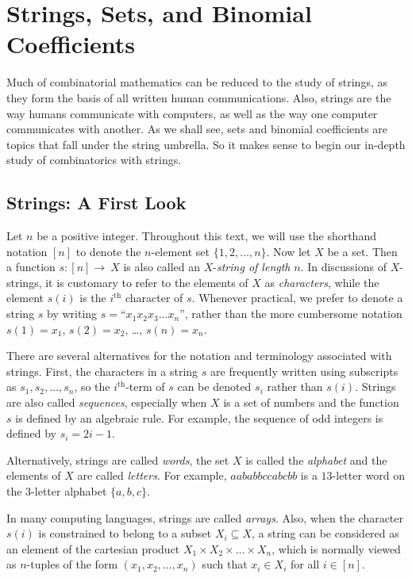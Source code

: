 
\chapter{Strings, Sets, and Binomial Coefficients}\label{ch:strings}

Much of combinatorial mathematics can be reduced to the study of
strings, as they form the basis of all written human communications.
Also, strings are the way humans communicate with computers, as well
as the way one computer communicates with another. As we shall see,
sets and binomial coefficients are topics that fall under the string
umbrella. So it makes sense to begin our in-depth study of
combinatorics with strings.

\section{Strings: A First Look}\label{s:strings:intro}

Let $n$ be a positive integer.  Throughout this text, we will use the
shorthand notation $[n]$ to denote the $n$-element set
$\{1,2,\dots,n\}$.  Now let $X$ be a set.  Then a function
$s\colon[n]\rightarrow~X$ is also called an $X$-\textit{string of
  length} $n$.  In discussions of $X$-strings, it is customary to
refer to the elements of $X$ as \textit{characters}, while the element
$s(i)$ is the $i^{\text{th}}$ character of $s$.  Whenever practical, we
prefer to denote a string $s$ by writing $s=$``$x_1x_2x_3\dots x_n$'',
rather than the more cumbersome notation $s(1)=x_1$, $s(2)=x_2$,
\dots, $s(n)=x_n$.

There are several alternatives for the notation and terminology
associated with strings.  First, the characters in a string $s$ are
frequently written using subscripts as $s_1,s_2,\dots,s_n$, so the
$i^{\text{th}}$-term of $s$ can be denoted $s_i$ rather than $s(i)$.
Strings are also called \textit{sequences}, especially when $X$ is a
set of numbers and the function $s$ is defined by an algebraic rule.
For example, the sequence of odd integers is defined by $s_i=2i-1$.

Alternatively, strings are called \textit{words}, the set $X$ is
called the \textit{alphabet} and the elements of $X$ are
called \textit{letters}.  For example, $aababbccabcbb$ is a
$13$-letter word on the $3$-letter alphabet $\{a,b,c\}$.

In many computing languages, strings are called \textit{arrays}.
Also, when the character $s(i)$ is constrained to belong to a subset
$X_i\subseteq X$, a string can be considered as an element of the
cartesian product $X_1\times X_2\times \dots\times X_n$, which
is normally viewed as $n$-tuples of the form $(x_1,x_2,\dots,x_n)$
such that $x_i\in X_i$ for all $i\in [n]$.

